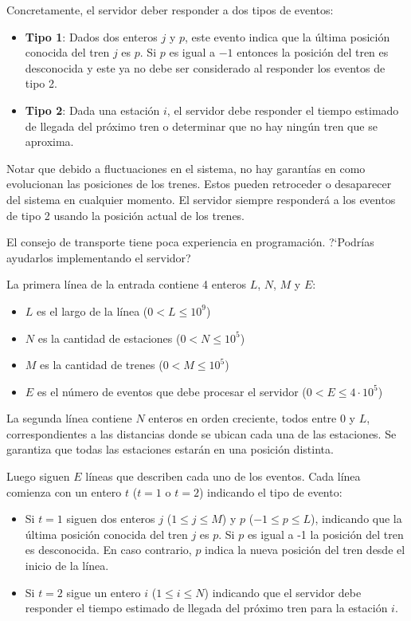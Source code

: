 \documentclass{oci}
\begin{document}
\begin{problemDescription}
  Concretamente, el servidor deber responder a dos tipos
  de eventos:
  \begin{itemize}
    \item \textbf{Tipo 1}: Dados dos enteros $j$ y $p$, este evento
    indica que la última posición conocida del tren $j$ es $p$.
    Si $p$ es igual a $-1$ entonces la posición del tren es desconocida
    y este ya no debe ser considerado al responder los eventos de tipo 2.
    \item \textbf{Tipo 2}: Dada una estación $i$, el servidor debe
    responder el tiempo estimado de llegada del próximo tren o determinar
    que no hay ningún tren que se aproxima.
  \end{itemize}

  Notar que debido a fluctuaciones en el sistema, no hay garantías
  en como evolucionan las posiciones de los trenes.
  Estos pueden retroceder o desaparecer del sistema en cualquier momento.
  El servidor siempre responderá a los eventos de tipo 2 usando
  la posición actual de los trenes.

  El consejo de transporte tiene poca experiencia en programación.
  ?`Podrías ayudarlos implementando el servidor?
\end{problemDescription}

\begin{inputDescription}
  La primera línea de la entrada contiene 4 enteros $L$, $N$, $M$ y $E$:
  \begin{itemize}
    \item $L$ es el largo de la línea ($0 < L \leq 10^9$)
    \item $N$ es la cantidad de estaciones ($0 < N \leq 10^5$)
    \item $M$ es la cantidad de trenes ($0 < M \leq 10^5$)
    \item $E$ es el número de eventos que debe procesar el servidor ($0 < E \leq 4\cdot 10^5$)
  \end{itemize}
  La segunda línea contiene $N$ enteros en orden creciente, todos entre 0 y $L$,
  correspondientes a las distancias donde se ubican cada una de las estaciones.
  Se garantiza que todas las estaciones estarán en una posición distinta.

  Luego siguen $E$ líneas que describen cada uno de los eventos.
  Cada línea comienza con un entero $t$ ($t=1$ o $t=2$) indicando el tipo de evento:
  \begin{itemize}
  \item Si $t=1$ siguen dos enteros $j$ ($1\leq j \leq M$) y $p$ ($-1\leq p \leq L$),
  indicando que la última posición conocida del tren $j$ es $p$.
  Si $p$ es igual a -1 la posición del tren es desconocida.
  En caso contrario, $p$ indica la nueva posición del tren desde el inicio
  de la línea.
  \item Si $t=2$ sigue un entero $i$ ($1\leq i \leq N$)
  indicando que el servidor debe responder el tiempo
  estimado de llegada del próximo tren para la estación $i$.
  \end{itemize}

\end{inputDescription}
\end{document}
